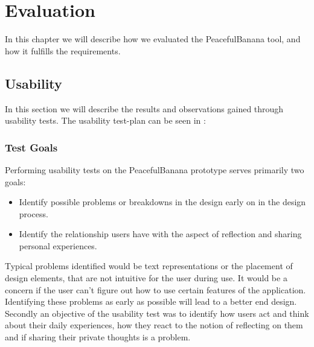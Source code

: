 \chapter{Evaluation}
In this chapter we will describe how we evaluated the PeacefulBanana tool, and how it fulfills the requirements.



\section{Usability}
In this section we will describe the results and observations gained through usability tests. The usability test-plan can be seen in : %

\subsection{Test Goals}
Performing usability tests on the PeacefulBanana prototype serves primarily two goals:
\begin{itemize}
\item Identify possible problems or breakdowns in the design\cite{ref:30} early on in the design process.
\item Identify the relationship users have with the aspect of reflection and sharing personal experiences.
\end{itemize}
Typical problems identified would be text representations or the placement of design elements, that are not intuitive for the user during use. It would be a concern if the user can't figure out how to use certain features of the application. Identifying these problems as early as possible will lead to a better end design. \\
Secondly an objective of the usability test was to identify how users act and think about their daily experiences, how they react to the notion of reflecting on them and if sharing their private thoughts is a problem. 

